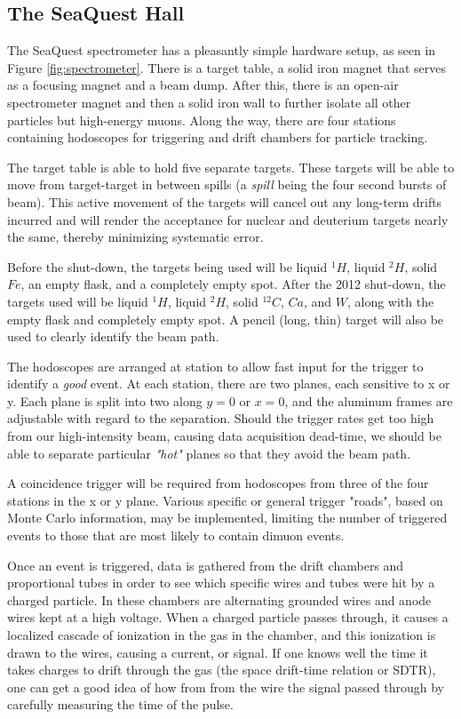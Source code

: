 \documentclass[11pt]{article}
\begin{document}
\subsection{The SeaQuest Hall}
The SeaQuest spectrometer has a pleasantly simple hardware setup, as seen in Figure \ref{fig:spectrometer}.  There is a target table, a solid iron magnet that serves as a focusing magnet and a beam dump.  After this, there is an open-air spectrometer magnet and then a solid iron wall to further isolate all other particles but high-energy muons.  Along the way, there are four stations containing hodoscopes for triggering and drift chambers for particle tracking.  

The target table is able to hold five separate targets.  These targets will be able to move from target-target in between spills (a \emph{spill} being the four second bursts of beam).  This active movement of the targets will cancel out any long-term drifts incurred and will render the acceptance for nuclear and deuterium targets nearly the same, thereby minimizing systematic error.

Before the shut-down, the targets being used will be liquid $^1H$, liquid $^2H$, solid $Fe$, an empty flask, and a completely empty spot.  After the 2012 shut-down, the targets used will be liquid $^1H$, liquid $^2H$, solid $^{12}C$, $Ca$, and $W$, along with the empty flask and completely empty spot.  A pencil (long, thin) target will also be used to clearly identify the beam path.

The hodoscopes are arranged at station to allow fast input for the trigger to identify a \emph{good} event.  At each station, there are two planes, each sensitive to x or y.  Each plane is split into two along $y=0$ or $x=0$, and the aluminum frames are adjustable with regard to the separation.  Should the trigger rates get too high from our high-intensity beam, causing data acquisition dead-time, we should be able to separate particular \emph{"hot"} planes so that they avoid the beam path.

A coincidence trigger will be required from hodoscopes from three of the four stations in the x or y plane. Various specific or general trigger "roads", based on Monte Carlo information, may be implemented, limiting the number of triggered events to those that are most likely to contain dimuon events.

Once an event is triggered, data is gathered from the drift chambers and proportional tubes in order to see which specific wires and tubes were hit by a charged particle.  In these chambers are alternating grounded wires and anode wires kept at a high voltage.  When a charged particle passes through, it causes a localized cascade of ionization in the gas in the chamber, and this ionization is drawn to the wires, causing a current, or signal.  If one knows well the time it takes charges to drift through the gas (the space drift-time relation or SDTR), one can get a good idea of how from from the wire the signal passed through by carefully measuring the time of the pulse. 
\end{document}
